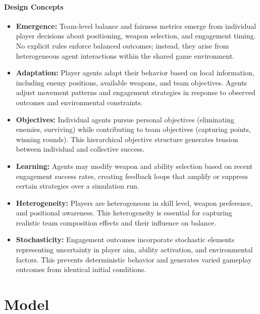 \documentclass{assignment}
\begin{document}
\paragraph{Design Concepts}
\begin{itemize}
    \item \textbf{{Emergence:}} Team-level balance and fairness metrics emerge from individual player decisions about positioning, weapon selection, and engagement timing. No explicit rules enforce balanced outcomes; instead, they arise from heterogeneous agent interactions within the shared game environment.

    \item \textbf{{Adaptation:}} Player agents adapt their behavior based on local information, including enemy positions, available weapons, and team objectives. Agents adjust movement patterns and engagement strategies in response to observed outcomes and environmental constraints.

    \item \textbf{{Objectives:}} Individual agents pursue personal objectives (eliminating enemies, surviving) while contributing to team objectives (capturing points, winning rounds). This hierarchical objective structure generates tension between individual and collective success.

    \item \textbf{{Learning:}} Agents may modify weapon and ability selection based on recent engagement success rates, creating feedback loops that amplify or suppress certain strategies over a simulation run.

    \item \textbf{{Heterogeneity:}} Players are heterogeneous in skill level, weapon preference, and positional awareness. This heterogeneity is essential for capturing realistic team composition effects and their influence on balance.

    \item \textbf{{Stochasticity:}} Engagement outcomes incorporate stochastic elements representing uncertainty in player aim, ability activation, and environmental factors. This prevents deterministic behavior and generates varied gameplay outcomes from identical initial conditions.
\end{itemize}

\section{Model}
\end{document}
